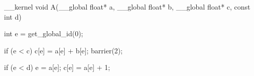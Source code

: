 __kernel void A(__global float* a, __global float* b, __global float* c, const int d) {
int e = get_global_id(0);

if (e < c) {
c[e] = a[e] + b[e];
}
barrier(2);

if (e < d) {
e = a[e];
c[e] = a[e] + 1;
}
}
